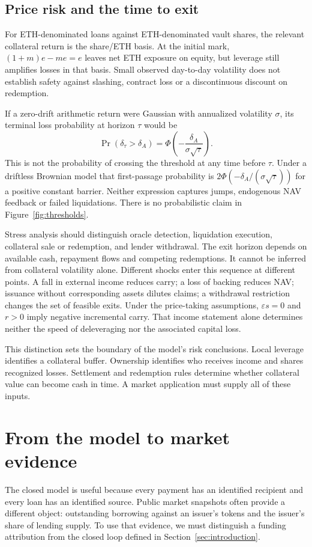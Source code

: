 \documentclass[12pt,oneside]{article}
\begin{document}
\subsection{Price risk and the time to exit}
For ETH-denominated loans against ETH-denominated vault shares, the
relevant collateral return is the share/ETH basis. At the initial
mark, $(1+m)e-me=e$ leaves net ETH exposure on equity, but leverage
still amplifies losses in that basis. Small observed day-to-day
volatility does not establish safety against slashing, contract loss
or a discontinuous discount on redemption.

If a zero-drift arithmetic return were Gaussian with annualized
volatility $\sigma$, its terminal loss probability at horizon $\tau$
would be
\[
 \Pr(\delta_\tau>\delta_A)
 =\Phi\left(-\frac{\delta_A}{\sigma\sqrt\tau}\right).
\]
This is not the probability of crossing the threshold at any time
before $\tau$. Under a driftless Brownian model that first-passage
probability is $2\Phi(-\delta_A/(\sigma\sqrt\tau))$ for a positive
constant barrier. Neither expression captures jumps, endogenous NAV
feedback or failed liquidations. There is no probabilistic claim in
Figure~\ref{fig:thresholds}.

Stress analysis should distinguish oracle detection, liquidation
execution, collateral sale or redemption, and lender withdrawal. The
exit horizon depends on available cash, repayment flows and competing
redemptions. It cannot be inferred from collateral volatility alone.
Different shocks enter this sequence at different points. A fall in
external income reduces carry; a loss of backing reduces NAV; issuance
without corresponding assets dilutes claims; a withdrawal restriction
changes the set of feasible exits. Under the price-taking assumptions,
$\varepsilon s=0$ and $r>0$ imply negative incremental carry. That
income statement alone determines neither the speed of deleveraging
nor the associated capital loss.

This distinction sets the boundary of the model's risk conclusions.
Local leverage identifies a collateral buffer. Ownership identifies
who receives income and shares recognized losses. Settlement and
redemption rules determine whether collateral value can become cash
in time. A market application must supply all of these inputs.

\section{From the model to market evidence}
\label{sec:case}
The closed model is useful because every payment has an identified
recipient and every loan has an identified source. Public market
snapshots often provide a different object: outstanding borrowing
against an issuer's tokens and the issuer's share of lending supply.
To use that evidence, we must distinguish a funding attribution from
the closed loop defined in Section~\ref{sec:introduction}.
\end{document}
